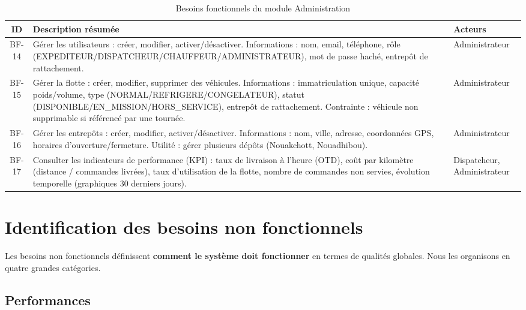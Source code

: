 \documentclass[12pt,a4paper]{report}
\begin{document}
\begin{table}[H]
\centering
\footnotesize
\begin{tabular}{|c|p{7.5cm}|p{4cm}|}
\hline
\textbf{ID} & \textbf{Description résumée} & \textbf{Acteurs} \\
\hline
BF-14 & Gérer les utilisateurs : créer, modifier, activer/désactiver. Informations : nom, email, téléphone, rôle (EXPEDITEUR/DISPATCHEUR/CHAUFFEUR/ADMINISTRATEUR), mot de passe haché, entrepôt de rattachement. & Administrateur \\
\hline
BF-15 & Gérer la flotte : créer, modifier, supprimer des véhicules. Informations : immatriculation unique, capacité poids/volume, type (NORMAL/REFRIGERE/CONGELATEUR), statut (DISPONIBLE/EN\_MISSION/HORS\_SERVICE), entrepôt de rattachement. Contrainte : véhicule non supprimable si référencé par une tournée. & Administrateur \\
\hline
BF-16 & Gérer les entrepôts : créer, modifier, activer/désactiver. Informations : nom, ville, adresse, coordonnées GPS, horaires d'ouverture/fermeture. Utilité : gérer plusieurs dépôts (Nouakchott, Nouadhibou). & Administrateur \\
\hline
BF-17 & Consulter les indicateurs de performance (KPI) : taux de livraison à l'heure (OTD), coût par kilomètre (distance / commandes livrées), taux d'utilisation de la flotte, nombre de commandes non servies, évolution temporelle (graphiques 30 derniers jours). & Dispatcheur, Administrateur \\
\hline
\end{tabular}
\caption{Besoins fonctionnels du module Administration}
\label{tab:bf-administration}
\end{table}


\section{Identification des besoins non fonctionnels}

Les besoins non fonctionnels définissent \textbf{comment le système doit fonctionner} en termes de qualités globales. Nous les organisons en quatre grandes catégories.

\subsection{Performances}
\end{document}
